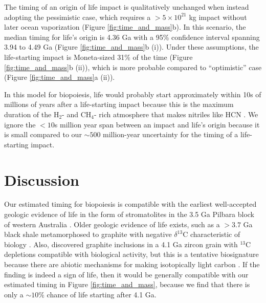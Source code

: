\documentclass[manuscript]{aastex63}
\begin{document}
The timing of an origin of life impact is qualitatively unchanged when instead adopting the \citet{Wogan_2023} pessimistic case, which requires a $> 5 \times 10^{21}$ kg impact without later ocean vaporization (Figure \ref{fig:time_and_mass}b). In this scenario, the median timing for life's origin is 4.36 Ga with a 95\% confidence interval spanning 3.94 to 4.49 Ga (Figure \ref{fig:time_and_mass}b (i)). Under these assumptions, the life-starting impact is Moneta-sized 31\% of the time (Figure \ref{fig:time_and_mass}b (ii)), which is more probable compared to ``optimistic'' case (Figure \ref{fig:time_and_mass}a (ii)).

In this model for biopoiesis, life would probably start approximately within 10s of millions of years after a life-starting impact because this is the maximum duration of the H$_2$- and CH$_4$- rich atmosphere that makes nitriles like HCN \citep{Wogan_2023}. We ignore the $< 10$s million year span between an impact and life's origin because it is small compared to our $\sim 500$ million-year uncertainty for the timing of a life-starting impact.

\section{Discussion}

Our estimated timing for biopoiesis is compatible with the earliest well-accepted geologic evidence of life in the form of stromatolites in the 3.5 Ga Pilbara block of western Australia \citep{Walter_1980,Buick_1981,Van_2018}. Older geologic evidence of life exists, such as a $> 3.7$ Ga black shale metamorphosed to graphite with negative $\delta^{13}$C characteristic of biology \citep{Rosing_1999,Ohtomo_2014}. Also, \citet{Bell_2015} discovered graphite inclusions in a 4.1 Ga zircon grain with $^{13}$C depletions compatible with biological activity, but this is a tentative biosignature because there are abiotic mechanisms for making isotopically light carbon \citep{Javaux_2019}. If the \citet{Bell_2015} finding is indeed a sign of life, then it would be generally compatible with our estimated timing in Figure \ref{fig:time_and_mass}, because we find that there is only a $\sim 10\%$ chance of life starting after 4.1 Ga.
\end{document}
